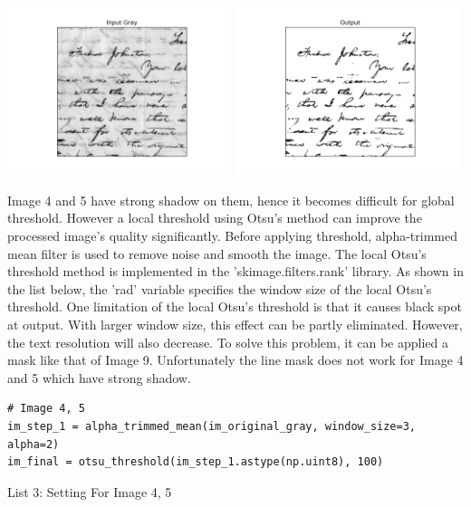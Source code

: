 \documentclass[titlepage]{article}
\begin{document}
\begin{center}
\includegraphics[width=0.49\textwidth]{img_3_gray.png}
\includegraphics[width=0.49\textwidth]{img_3_output.png}
\end{center}

Image 4 and 5 have strong shadow on them, hence it becomes difficult for
global threshold. However a local threshold using Otsu's method can improve
the processed image's quality significantly. Before applying threshold,
alpha-trimmed mean filter is used to remove noise and smooth the image. The
local Otsu's threshold method is implemented in the 'skimage.filters.rank'
library. As shown in the list below, the 'rad' variable specifies the window
size of the local Otsu's threshold. One limitation of the local Otsu's
threshold is that it causes black spot at output. With larger window size,
this effect can be partly eliminated. However, the text resolution will also
decrease. To solve this problem, it can be applied a mask like that of
Image 9. Unfortunately the line mask does not work for Image 4 and 5 which
have strong shadow.

\begin{listing}
\begin{verbatim}
# Image 4, 5 
im_step_1 = alpha_trimmed_mean(im_original_gray, window_size=3, alpha=2)
im_final = otsu_threshold(im_step_1.astype(np.uint8), 100)
\end{verbatim}
\centering
\caption{List 3: Setting For Image 4, 5}
\newline
\end{listing}
\end{document}

